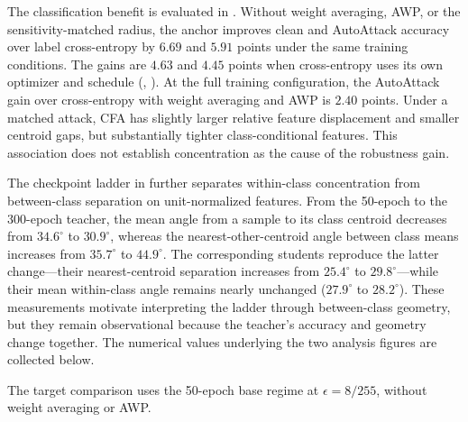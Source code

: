 \documentclass{article} %
\theoremstyle{plain}
\begin{document}
The classification benefit is evaluated in . Without weight averaging, AWP,
or the sensitivity-matched radius, the anchor improves clean and AutoAttack accuracy over label
cross-entropy by $6.69$ and $5.91$ points under the same training conditions. The gains are $4.63$
and $4.45$ points when cross-entropy uses its own optimizer and schedule
(, ). At the full training configuration, the AutoAttack gain
over cross-entropy with weight averaging and AWP is $2.40$ points. Under a matched attack, CFA has
slightly larger relative feature displacement and smaller centroid gaps, but substantially tighter
class-conditional features. This association does not establish concentration as the cause of the
robustness gain.

The checkpoint ladder in  further separates within-class concentration from
between-class separation on unit-normalized features. From the 50-epoch to the 300-epoch teacher,
the mean angle from a sample to its class centroid decreases from $34.6^\circ$ to $30.9^\circ$,
whereas the nearest-other-centroid angle between class means increases from $35.7^\circ$ to $44.9^\circ$. The
corresponding students reproduce the latter change---their nearest-centroid separation increases from
$25.4^\circ$ to $29.8^\circ$---while their mean within-class angle remains nearly unchanged
($27.9^\circ$ to $28.2^\circ$). These measurements motivate interpreting the ladder through
between-class geometry, but they remain observational because the teacher's accuracy and geometry
change together. The numerical values underlying the two analysis figures are collected below.

The target comparison uses the 50-epoch base regime at $\epsilon=8/255$, without weight averaging
or AWP.
\end{document}
